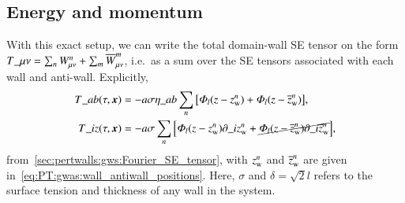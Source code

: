 \subsection{Energy and momentum}
    With this exact setup, we can write the total domain-wall SE tensor on the form %
    $T\_{\mu\nu}= \sum_{n}{W^n_{\mu\nu}} + \sum_m {\overline{W}^{m}_{\mu\nu}} $, 
    i.e.~as a sum over the SE tensors associated with each wall and anti-wall. Explicitly,
    \begin{equation} 
        \begin{split}
            T\_{ab}(\tau, \boldsymbol{x}) &= -a \sigma \eta\_{ab} \sum_{n} {\left[ \varPhi_{l}(z-z_\mathrm{w}^n)+ \varPhi_{l}(z-\overline{z}_\mathrm{w}^n)  \right]},  \\
            T\_{iz}(\tau, \boldsymbol{x}) &= -a \sigma \sum_{n} {\left[ \varPhi_{l}(z-z_\mathrm{w}^n) \partial\_i z_\mathrm{w}^n + \cancel{ \varPhi_{l}(z-\overline{z}_\mathrm{w}^n) \partial\_i \overline{z}_\mathrm{w}^n}  \right]},
        \end{split}
    \end{equation}
    from~\cref{sec:pertwalls:gws:Fourier_SE_tensor}, with $z_\mathrm{w}^n$ and $\overline{z}_\mathrm{w}^n$ are given in~\cref{eq:PT:gwas:wall_antiwall_positions}. Here, $\sigma$ and $\delta=\sqrt{2}l$ refers to the surface tension and thickness of any wall in the system.

